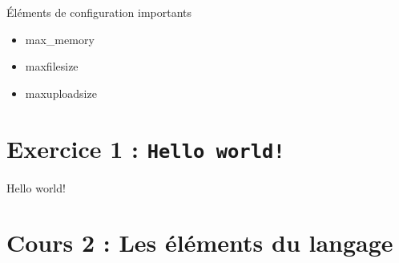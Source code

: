 \documentclass{beamer}
\begin{document}
\begin{frame}{Éléments de configuration importants}
	\begin{itemize}
		\item max\_memory
		\item maxfilesize
		\item maxuploadsize
	\end{itemize}
\end{frame}

\section{Exercice \textnumero{}1 : \texttt{Hello world!}}

\begin{frame}{Hello world!}
\end{frame}

\section{Cours \textnumero{}2 : Les éléments du langage}


\end{document}
